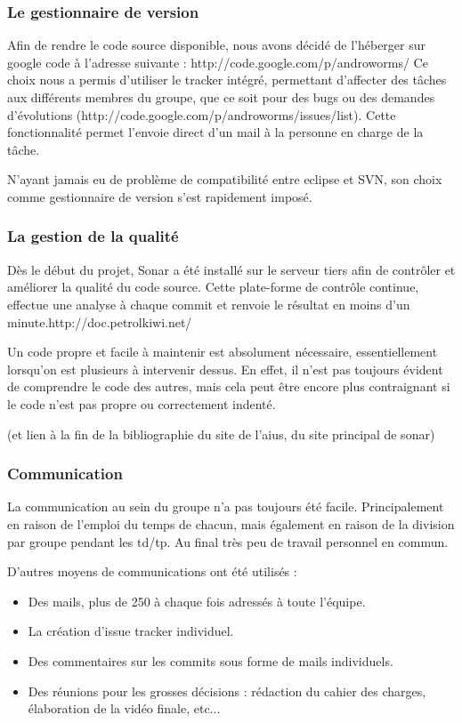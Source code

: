 \documentclass{report}
\begin{document}
\subsubsection{Le gestionnaire de version}

Afin de rendre le code source disponible, nous avons décidé de l’héberger sur google code à l’adresse suivante : http://code.google.com/p/androworms/
Ce choix nous a permis d’utiliser le tracker intégré, permettant d’affecter des tâches aux différents membres du groupe, que ce soit pour des bugs ou des demandes d’évolutions (http://code.google.com/p/androworms/issues/list). Cette fonctionnalité permet l’envoie direct d’un mail à la personne en charge de la tâche.

N’ayant jamais eu de problème de compatibilité entre eclipse et SVN, son choix comme gestionnaire de version s’est rapidement imposé.

\subsubsection{La gestion de la qualité}

Dès le début du projet, Sonar a été installé sur le serveur tiers afin de contrôler et améliorer la qualité du code source.
Cette plate-forme de contrôle continue, effectue une analyse à chaque commit et renvoie le résultat en moins d’un minute.http://doc.petrolkiwi.net/

Un code propre et facile à maintenir est absolument nécessaire, essentiellement lorsqu’on est plusieurs à intervenir dessus. En effet, il n’est pas toujours évident de comprendre le code des autres, mais cela peut être encore plus contraignant si le code n’est pas propre ou correctement indenté.

(et lien à la fin de la bibliographie du site de l’aius, du site principal de sonar)

\subsubsection{Communication}

La communication au sein du groupe n’a pas toujours été facile. Principalement en raison de l’emploi du temps de chacun, mais également en raison de la division par groupe pendant les td/tp. Au final très peu de travail personnel en commun.

D’autres moyens de communications ont été utilisés :
\begin{itemize}
\item Des mails, plus de 250 à chaque fois adressés à toute l’équipe.
\item La création d’issue tracker individuel.
\item Des commentaires sur les commits sous forme de mails individuels.
\item Des réunions pour les grosses décisions : rédaction du cahier des charges, élaboration de la vidéo finale, etc...
\end{itemize}
\end{document}
